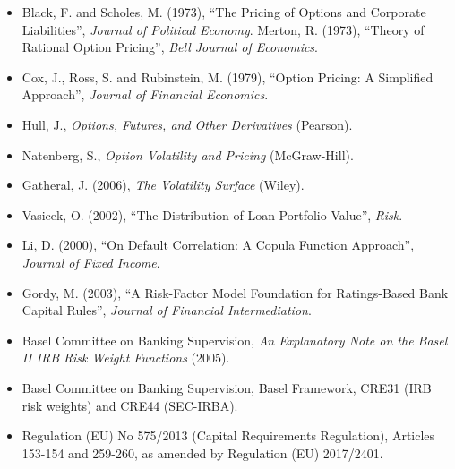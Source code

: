 \documentclass[10pt,a4paper]{article}
\providecommand{\tightlist}{\setlength{\itemsep}{1pt}\setlength{\parskip}{0pt}}
\numberwithin{equation}{section}
\begin{document}
\begin{itemize}
\tightlist
\item
  Black, F. and Scholes, M. (1973), ``The Pricing of Options and Corporate Liabilities'', \emph{Journal of Political Economy}. Merton, R. (1973), ``Theory of Rational Option Pricing'', \emph{Bell Journal of Economics}.
\item
  Cox, J., Ross, S. and Rubinstein, M. (1979), ``Option Pricing: A Simplified Approach'', \emph{Journal of Financial Economics}.
\item
  Hull, J., \emph{Options, Futures, and Other Derivatives} (Pearson).
\item
  Natenberg, S., \emph{Option Volatility and Pricing} (McGraw-Hill).
\item
  Gatheral, J. (2006), \emph{The Volatility Surface} (Wiley).
\item
  Vasicek, O. (2002), ``The Distribution of Loan Portfolio Value'', \emph{Risk}.
\item
  Li, D. (2000), ``On Default Correlation: A Copula Function Approach'', \emph{Journal of Fixed Income}.
\item
  Gordy, M. (2003), ``A Risk-Factor Model Foundation for Ratings-Based Bank Capital Rules'', \emph{Journal of Financial Intermediation}.
\item
  Basel Committee on Banking Supervision, \emph{An Explanatory Note on the Basel II IRB Risk Weight Functions} (2005).
\item
  Basel Committee on Banking Supervision, Basel Framework, CRE31 (IRB risk weights) and CRE44 (SEC-IRBA).
\item
  Regulation (EU) No 575/2013 (Capital Requirements Regulation), Articles 153-154 and 259-260, as amended by Regulation (EU) 2017/2401.
\end{itemize}
\end{document}
